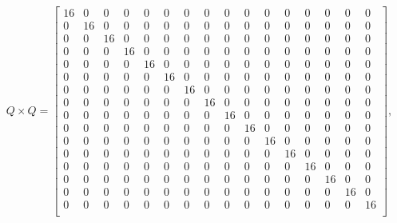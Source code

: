 \documentclass[11pt]{article}
\begin{document}
$$Q\times Q = 
\left[\begin{smallmatrix}
    16 & 0 & 0 & 0 & 0 & 0 & 0 & 0 & 0 & 0 & 0 & 0 & 0 & 0 & 0 & 0 \\
    0 & 16 & 0 & 0 & 0 & 0 & 0 & 0 & 0 & 0 & 0 & 0 & 0 & 0 & 0 & 0 \\
    0 & 0 & 16 & 0 & 0 & 0 & 0 & 0 & 0 & 0 & 0 & 0 & 0 & 0 & 0 & 0 \\
    0 & 0 & 0 & 16&  0 & 0 & 0 & 0 & 0 & 0 & 0 & 0 & 0 & 0 & 0 & 0 \\
    0 & 0 & 0 & 0 & 16 & 0 & 0 & 0 & 0 & 0 & 0 & 0 & 0 & 0 & 0 & 0 \\
    0 & 0 & 0 & 0 & 0 & 16 & 0 & 0 & 0 & 0 & 0 & 0 & 0 & 0 & 0 & 0 \\
    0 & 0 & 0 & 0 & 0 & 0 & 16 & 0 & 0 & 0 & 0 & 0 & 0 & 0 & 0 & 0 \\
    0 & 0 & 0 & 0 & 0 & 0 & 0 & 16 & 0 & 0 & 0 & 0 & 0 & 0 & 0 & 0 \\
    0 & 0 & 0 & 0 & 0 & 0 & 0 & 0 & 16 & 0 & 0 & 0 & 0 & 0 & 0 & 0 \\
    0 & 0 & 0 & 0 & 0 & 0 & 0 & 0 & 0 & 16 & 0 & 0 & 0 & 0 & 0 & 0 \\
    0 & 0 & 0 & 0 & 0 & 0 & 0 & 0 & 0 & 0 & 16 & 0 & 0 & 0 & 0 & 0 \\
    0 & 0 & 0 & 0 & 0 & 0 & 0 & 0 & 0 & 0 & 0 & 16&  0 & 0 & 0 & 0 \\
    0 & 0 & 0 & 0 & 0 & 0 & 0 & 0 & 0 & 0 & 0 & 0 & 16 & 0 & 0 & 0 \\
    0 & 0 & 0 & 0 & 0 & 0 & 0 & 0 & 0 & 0 & 0 & 0 & 0 & 16 & 0 & 0 \\
    0 & 0 & 0 & 0 & 0 & 0 & 0 & 0 & 0 & 0 & 0 & 0 & 0 & 0 & 16 & 0 \\
    0 & 0 & 0 & 0 & 0 & 0 & 0 & 0 & 0 & 0 & 0 & 0 & 0 & 0 & 0 & 16 \\
\end{smallmatrix}\right],
$$
\end{document}
